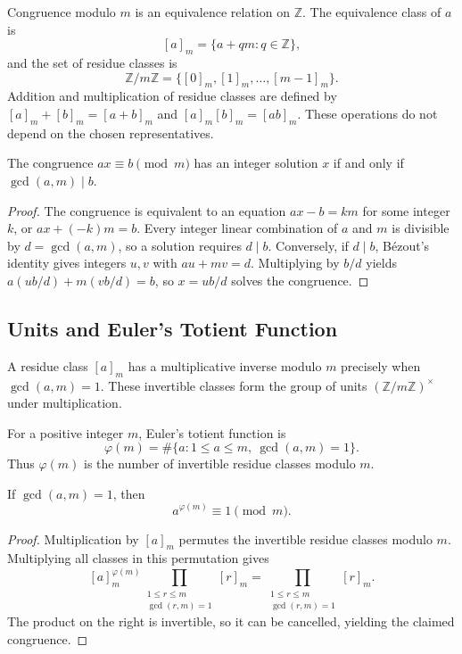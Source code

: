 Congruence modulo $m$ is an equivalence relation on $\mathbb{Z}$. The equivalence class of $a$ is
\[
 [a]_m=\{a+qm:q\in\mathbb{Z}\},
\]
and the set of residue classes is
\[
 \mathbb{Z}/m\mathbb{Z}=\{[0]_m,[1]_m,\ldots,[m-1]_m\}.
\]
Addition and multiplication of residue classes are defined by $[a]_m+[b]_m=[a+b]_m$ and $[a]_m[b]_m=[ab]_m$. These operations do not depend on the chosen representatives.

\begin{theorem}
The congruence $ax\equiv b\pmod m$ has an integer solution $x$ if and only if $\gcd(a,m)\mid b$.
\end{theorem}

\begin{proof}
The congruence is equivalent to an equation $ax-b=km$ for some integer $k$, or $ax+(-k)m=b$. Every integer linear combination of $a$ and $m$ is divisible by $d=\gcd(a,m)$, so a solution requires $d\mid b$. Conversely, if $d\mid b$, Bézout's identity gives integers $u,v$ with $au+mv=d$. Multiplying by $b/d$ yields $a(u b/d)+m(v b/d)=b$, so $x=u b/d$ solves the congruence.
\end{proof}

\subsection{Units and Euler's Totient Function}

A residue class $[a]_m$ has a multiplicative inverse modulo $m$ precisely when $\gcd(a,m)=1$. These invertible classes form the group of units $(\mathbb{Z}/m\mathbb{Z})^\times$ under multiplication.

\begin{definition}
For a positive integer $m$, Euler's totient function is
\[
 \varphi(m)=\#\{a:1\leq a\leq m,\ \gcd(a,m)=1\}.
\]
Thus $\varphi(m)$ is the number of invertible residue classes modulo $m$.
\end{definition}

\begin{theorem}
If $\gcd(a,m)=1$, then
\[
 a^{\varphi(m)}\equiv1\pmod m.
\]
\end{theorem}

\begin{proof}
Multiplication by $[a]_m$ permutes the invertible residue classes modulo $m$. Multiplying all classes in this permutation gives
\[
 [a]_m^{\varphi(m)}\prod_{\substack{1\leq r\leq m\\\gcd(r,m)=1}}[r]_m
 =\prod_{\substack{1\leq r\leq m\\\gcd(r,m)=1}}[r]_m.
\]
The product on the right is invertible, so it can be cancelled, yielding the claimed congruence.
\end{proof}

